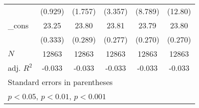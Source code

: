 {\begin{tabular}{l*{5}{c}}
            &     (0.929)         &     (1.757)         &     (3.357)         &     (8.789)         &     (12.80)         \\
[1em]
\_cons      &       23.25\sym{***}&       23.80\sym{***}&       23.81\sym{***}&       23.79\sym{***}&       23.80\sym{***}\\
            &     (0.333)         &     (0.289)         &     (0.277)         &     (0.270)         &     (0.270)         \\
\hline
\(N\)       &       12863         &       12863         &       12863         &       12863         &       12863         \\
adj. \(R^{2}\)&      -0.033         &      -0.033         &      -0.033         &      -0.033         &      -0.033         \\
\hline\hline
\multicolumn{6}{l}{\footnotesize Standard errors in parentheses}\\
\multicolumn{6}{l}{\footnotesize \sym{*} \(p<0.05\), \sym{**} \(p<0.01\), \sym{***} \(p<0.001\)}\\
\end{tabular}
}
